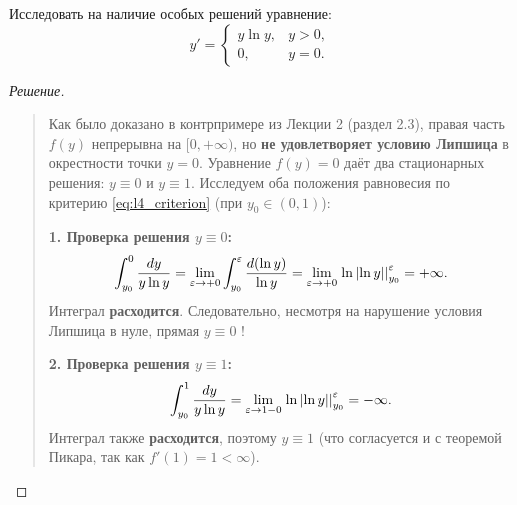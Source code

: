 \begin{example}
    Исследовать на наличие особых решений уравнение:
    \begin{equation} \label{eq:l4_ex2_ode}
        y' =
        \begin{cases}
            y \ln y, & y > 0, \\
            0, & y = 0.
        \end{cases} \tag{4}
    \end{equation}

    \begin{proof}[Решение]~\\
        \begin{quote}
            Как было доказано в контрпримере из Лекции 2 (раздел 2.3), правая
            часть $f(y)$ непрерывна на $[0, +\infty)$, но \textbf{не
            удовлетворяет условию Липшица} в окрестности точки $y = 0$.
            Уравнение $f(y) = 0$ даёт два стационарных решения: $y \equiv 0$ и
            $y \equiv 1$. Исследуем оба положения равновесия по критерию
            \eqref{eq:l4_criterion} (при $y_0 \in (0, 1)$):

            \textbf{1. Проверка решения $y \equiv 0$:}
            \[
                \int_{y_0}^{0} \frac{dy}{y \ln y} =
                \lim_{\varepsilon \to +0} \int_{y_0}^{\varepsilon} \frac{d(\ln y)}{\ln y} =
                \lim_{\varepsilon \to +0} \left. \ln \left| \ln y \right| \right|_{y_0}^{\varepsilon}
                = +\infty.
            \]
            Интеграл \textbf{расходится}. Следовательно, несмотря на нарушение
            условия Липшица в нуле, прямая $y \equiv 0$ !

            \textbf{2. Проверка решения $y \equiv 1$:}
            \[
                \int_{y_0}^{1} \frac{dy}{y \ln y} =
                \lim_{\varepsilon \to 1-0} \left. \ln \left| \ln y \right| \right|_{y_0}^{\varepsilon}
                = -\infty.
            \]
            Интеграл также \textbf{расходится}, поэтому $y \equiv 1$
             (что согласуется и с
            теоремой Пикара, так как $f'(1) = 1 < \infty$).
        \end{quote}
    \end{proof}
\end{example}

